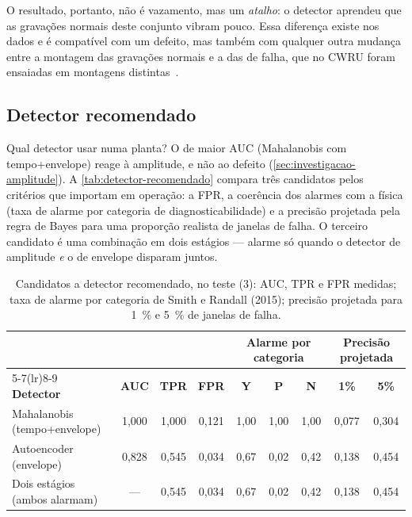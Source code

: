 O resultado, portanto, não é vazamento, mas um \emph{atalho}: o detector aprendeu
que as gravações normais deste conjunto vibram pouco. Essa diferença existe
nos dados e é compatível com um defeito, mas também com qualquer outra mudança
entre a montagem das gravações normais e a das de falha, que no CWRU foram
ensaiadas em montagens distintas~\cite{smith2015}.

\subsection{Detector recomendado}
\label{sec:res-detector-recomendado}

Qual detector usar numa planta? O de maior AUC (Mahalanobis com tempo+envelope)
reage à amplitude, e não ao defeito (\autoref{sec:investigacao-amplitude}). A
\autoref{tab:detector-recomendado} compara três candidatos pelos critérios que
importam em operação: a FPR, a coerência dos alarmes com a física (taxa de
alarme por categoria de diagnosticabilidade) e a precisão projetada pela regra de
Bayes para uma proporção realista de janelas de falha. O terceiro candidato é uma
combinação em dois estágios --- alarme só quando o detector de amplitude
\emph{e} o de envelope disparam juntos.

\begin{table}[htb]
  \centering
  \caption{Candidatos a detector recomendado, no teste (\SI{3}{\hp}): AUC, TPR e
  FPR medidas; taxa de alarme por categoria de Smith e Randall (2015); precisão
  projetada para \SI{1}{\percent} e \SI{5}{\percent} de janelas de falha.}
  \label{tab:detector-recomendado}
  \scriptsize
  \begin{tabular}{lcccccccc}
    \toprule
    & & & & \multicolumn{3}{c}{\textbf{Alarme por categoria}} & \multicolumn{2}{c}{\textbf{Precisão projetada}} \\
    \cmidrule(lr){5-7}\cmidrule(lr){8-9}
    \textbf{Detector} & \textbf{AUC} & \textbf{TPR} & \textbf{FPR} & \textbf{Y} & \textbf{P} & \textbf{N} & \textbf{1\%} & \textbf{5\%} \\
    \midrule
    Mahalanobis (tempo+envelope)   & 1,000 & 1,000 & 0,121 & 1,00 & 1,00 & 1,00 & 0,077 & 0,304 \\
    Autoencoder (envelope)         & 0,828 & 0,545 & 0,034 & 0,67 & 0,02 & 0,42 & 0,138 & 0,454 \\
    Dois estágios (ambos alarmam)  & ---   & 0,545 & 0,034 & 0,67 & 0,02 & 0,42 & 0,138 & 0,454 \\
    \bottomrule
  \end{tabular}
\end{table}

